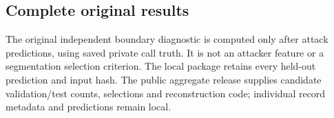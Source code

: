 \subsection{Complete original results}



The original independent boundary diagnostic is computed only after attack predictions, using saved private call truth. It is not an attacker feature or a segmentation selection criterion. The local package retains every held-out prediction and input hash. The public aggregate release supplies candidate validation/test counts, selections and reconstruction code; individual record metadata and predictions remain local.
